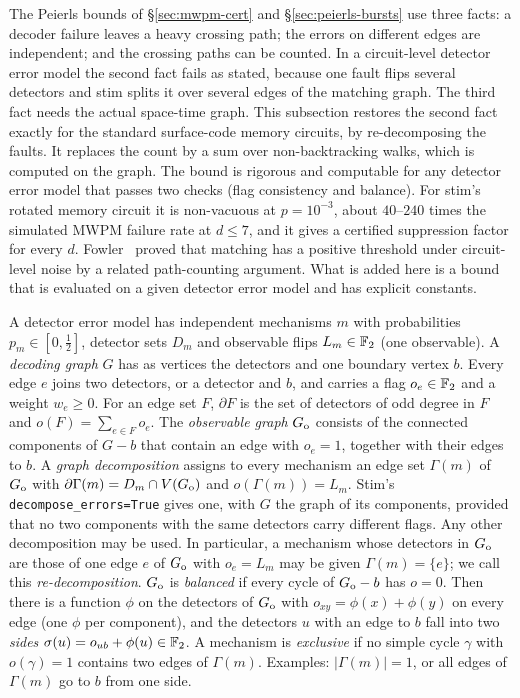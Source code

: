 The Peierls bounds of \S\ref{sec:mwpm-cert} and \S\ref{sec:peierls-bursts} use three facts: a decoder failure leaves a heavy crossing path; the errors on different edges are independent; and the crossing paths can be counted. In a circuit-level detector error model the second fact fails as stated, because one fault flips several detectors and stim splits it over several edges of the matching graph. The third fact needs the actual space-time graph.
This subsection restores the second fact exactly for the standard surface-code memory circuits, by re-decomposing the faults. It replaces the count by a sum over non-backtracking walks, which is computed on the graph. The bound is rigorous and computable for any detector error model that passes two checks (flag consistency and balance). For stim's rotated memory circuit it is non-vacuous at $p=10^{-3}$, about $40$--$240$ times the simulated MWPM failure rate at $d\le7$, and it gives a certified suppression factor for every $d$.
Fowler~\cite{Fowler} proved that matching has a positive threshold under circuit-level noise by a related path-counting argument. What is added here is a bound that is evaluated on a given detector error model and has explicit constants.

\begin{definition}\label{def:obs-graph}
A detector error model has independent mechanisms $m$ with probabilities $p_m\in[0,\tfrac12]$, detector sets $D_m$ and observable flips $L_m\in\mathbb{F}_2$ (one observable).
A \emph{decoding graph} $G$ has as vertices the detectors and one boundary vertex $b$. Every edge $e$ joins two detectors, or a detector and $b$, and carries a flag $o_e\in\mathbb{F}_2$ and a weight $w_e\ge0$. For an edge set $F$, $\partial F$ is the set of detectors of odd degree in $F$ and $o(F)=\sum_{e\in F}o_e$.
The \emph{observable graph} $G_{\rm o}$ consists of the connected components of $G-b$ that contain an edge with $o_e=1$, together with their edges to $b$. A \emph{graph decomposition} assigns to every mechanism an edge set $\Gamma(m)$ of $G_{\rm o}$ with $\partial\Gamma(m)=D_m\cap V(G_{\rm o})$ and $o(\Gamma(m))=L_m$.
Stim's \texttt{decompose\_errors=True} gives one, with $G$ the graph of its components, provided that no two components with the same detectors carry different flags. Any other decomposition may be used. In particular, a mechanism whose detectors in $G_{\rm o}$ are those of one edge $e$ of $G_{\rm o}$ with $o_e=L_m$ may be given $\Gamma(m)=\{e\}$; we call this \emph{re-decomposition}.
$G_{\rm o}$ is \emph{balanced} if every cycle of $G_{\rm o}-b$ has $o=0$. Then there is a function $\phi$ on the detectors of $G_{\rm o}$ with $o_{xy}=\phi(x)+\phi(y)$ on every edge (one $\phi$ per component), and the detectors $u$ with an edge to $b$ fall into two \emph{sides} $\sigma(u)=o_{ub}+\phi(u)\in\mathbb{F}_2$.
A mechanism is \emph{exclusive} if no simple cycle $\gamma$ with $o(\gamma)=1$ contains two edges of $\Gamma(m)$. Examples: $|\Gamma(m)|=1$, or all edges of $\Gamma(m)$ go to $b$ from one side.
\end{definition}

